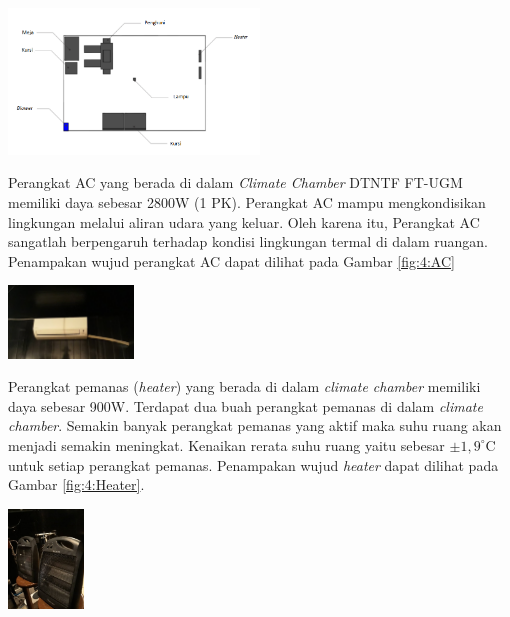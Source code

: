 \documentclass[a4paper,10pt]{article}
\makeatletter
\newenvironment{body}{\begin{multicols}{2}}{\end{multicols}}
\renewenvironment{figure}
{\def\@captype{figure}%
	\captionsetup{labelsep=period,format=hang,font=footnotesize,justification=justified}
}
{}
\makeatother
\begin{document}
\begin{body}
		\begin{figure}
			\centering
			\includegraphics[width=0.5\textwidth]{figures/KondisiChamber}
			\caption{Posisi Komponen-Komponen di dalam \textit{Climate Chamber}}
			\label{fig:4:KondisiChamber}
		\end{figure}
		\vspace{2mm}
		
		Perangkat AC yang berada di dalam \textit{Climate Chamber} DTNTF FT-UGM memiliki daya sebesar 2800W (1 PK). Perangkat AC mampu mengkondisikan lingkungan melalui aliran udara yang keluar. Oleh karena itu, Perangkat AC sangatlah berpengaruh terhadap kondisi lingkungan termal di dalam ruangan. Penampakan wujud perangkat AC dapat dilihat pada Gambar \ref{fig:4:AC}\\
		
		\begin{figure}
			\centering
			\includegraphics[width=0.25\textwidth]{figures/AC}
			\caption{Perangkat AC}
			\label{fig:4:AC}
		\end{figure}
		\vspace{1em}
		
		Perangkat pemanas (\textit{heater}) yang berada di dalam \textit{climate chamber} memiliki daya sebesar 900W. Terdapat dua buah perangkat pemanas di dalam \textit{climate chamber}. Semakin banyak perangkat pemanas yang aktif maka suhu ruang akan menjadi semakin meningkat. Kenaikan rerata suhu ruang yaitu sebesar $\pm1,9^\circ$C untuk setiap perangkat pemanas. Penampakan wujud \textit{heater} dapat dilihat pada Gambar \ref{fig:4:Heater}.\\
		
		\begin{figure}
			\centering
			\includegraphics[width=0.15\textwidth]{figures/Heater}
			\caption{Perangkat Heater}
			\label{fig:4:Heater}
		\end{figure}
		\vspace{2mm}
		

\end{body}
\end{document}

